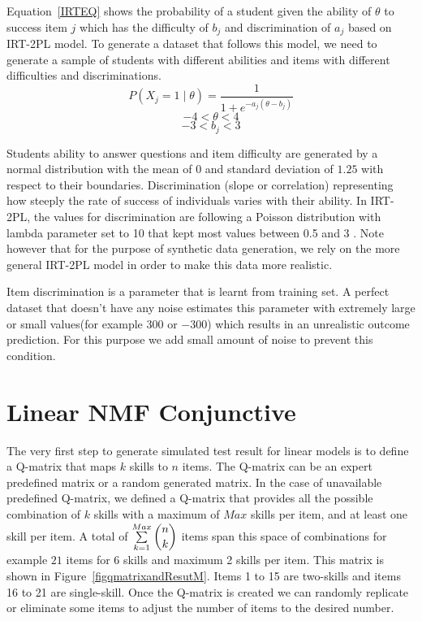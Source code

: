 Equation~\ref{IRTEQ} shows the probability of a student given the ability of $\theta$ to success item $j$ which has the difficulty of $b_j$ and discrimination of $a_j$ based on IRT-2PL model. To generate a dataset that follows this model, we need to generate a sample of students with different abilities and items with different difficulties and discriminations. 
\begin{equation}
P(X_j\!=\!1\;|\;\theta) = \frac{1}{1+e^{-a_j(\theta-b_j)}}
\label{IRTEQ}
\end{equation}
\[-4 < \theta < 4\]
\[-3 < b_j < 3\]

Students ability to answer questions and item difficulty are generated by a normal distribution with the mean of $0$ and standard deviation of $1.25$ with respect to their boundaries. Discrimination (slope or correlation) representing how steeply the rate of success of individuals varies with their ability. In IRT-2PL, the values for discrimination are following a Poisson distribution with lambda parameter set to 10 that kept most values between 0.5 and 3 . Note however that for the purpose of synthetic data generation, we rely on the more general IRT-2PL model in order to make this data more realistic.

Item discrimination is a parameter that is learnt from training set. A perfect dataset that doesn't have any noise estimates this parameter with extremely large or small values(for example $300$ or $-300$)  which results in an unrealistic outcome prediction. For this purpose we add small amount of noise to prevent this condition.

\section{Linear NMF Conjunctive}

The very first step to generate simulated test result for linear models is to define a Q-matrix that maps $k$ skills to $n$ items. The Q-matrix can be an expert predefined matrix or a random generated matrix. In the case of unavailable predefined Q-matrix, we defined a Q-matrix that provides all the possible combination of $k$ skills with a maximum of $Max$ skills per item, and at least one skill per item. A total of $\sum\limits_{k=1}^{Max} \dbinom{n}{k}$ items span this space of combinations for example $21$ items for 6 skills and maximum 2 skills per item. This matrix is shown in Figure~\ref{figqmatrixandResutM}. Items 1 to 15 are two-skills and items 16 to 21 are single-skill. Once the Q-matrix is created we can randomly replicate or eliminate some items to adjust the number of items to the desired number. 

